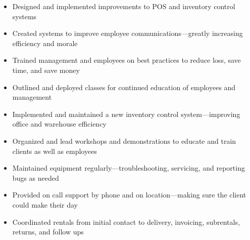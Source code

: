 \documentclass[letterpaper]{article}        %
\begin{document}
  \begin{itemize}
  
  \item Designed and implemented improvements to POS and inventory control systems
  
  \item Created systems to improve employee communications---greatly increasing efficiency and morale
  
  \item Trained management and employees on best practices to reduce loss, save time, and save money
  
  \item Outlined and deployed classes for continued education of employees and management
  
  \end{itemize}
  
  
  
  \begin{itemize}
  
  \item Implemented and maintained a new inventory control system---improving office and warehouse efficiency
  
  \item Organized and lead workshops and demonstrations to educate and train clients as well as employees
  
  \item Maintained equipment regularly---troubleshooting, servicing, and reporting bugs as needed
  
  \item Provided on call support by phone and on location---making sure the client could make their day
  
  \item Coordinated rentals from initial contact to delivery, invoicing, subrentals, returns, and follow ups
  
  \end{itemize}
  
  
  
\end{document}
